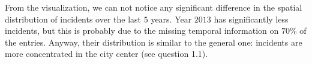 From the visualization, we can not notice any significant difference in the spatial distribution of incidents over the last $5$ years.
Year $2013$ has significantly less incidents, but this is probably due to the missing temporal information on $70\%$ of the entries.
Anyway, their distribution is similar to the general one: incidents are more concentrated in the city center (see question 1.1).

